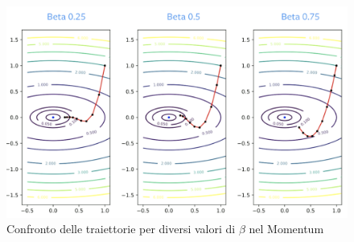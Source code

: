 \begin{figure}[ht]
    \centering
    \includegraphics[width=\textwidth]{figure/DampingFactMomentum.png}
    \caption{Confronto delle traiettorie per diversi valori di $\beta$ nel Momentum}
\end{figure}

